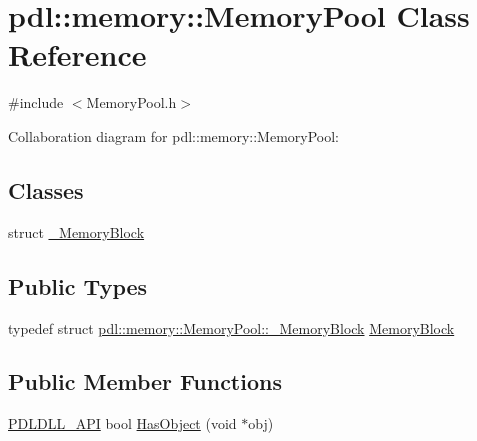 \hypertarget{classpdl_1_1memory_1_1_memory_pool}{}\section{pdl\+::memory\+::Memory\+Pool Class Reference}
\label{classpdl_1_1memory_1_1_memory_pool}


{\ttfamily \#include $<$Memory\+Pool.\+h$>$}



Collaboration diagram for pdl\+::memory\+::Memory\+Pool\+:
\subsection*{Classes}
\begin{DoxyCompactItemize}
\item 
struct \mbox{\hyperlink{structpdl_1_1memory_1_1_memory_pool_1_1___memory_block}{\+\_\+\+Memory\+Block}}
\end{DoxyCompactItemize}
\subsection*{Public Types}
\begin{DoxyCompactItemize}
\item 
typedef struct \mbox{\hyperlink{structpdl_1_1memory_1_1_memory_pool_1_1___memory_block}{pdl\+::memory\+::\+Memory\+Pool\+::\+\_\+\+Memory\+Block}} \mbox{\hyperlink{classpdl_1_1memory_1_1_memory_pool_ae6b2ec19cb71cae4fa60b7d342a1743b}{Memory\+Block}}
\end{DoxyCompactItemize}
\subsection*{Public Member Functions}
\begin{DoxyCompactItemize}
\item 
\mbox{\hyperlink{_p_d_core_8h_ae8c5186e53170509c65eaabab6c2c705}{P\+D\+L\+D\+L\+L\+\_\+\+A\+PI}} bool \mbox{\hyperlink{classpdl_1_1memory_1_1_memory_pool_a891cf16919c413a0acf7d4b39022892b}{Has\+Object}} (void $\ast$obj)
\end{DoxyCompactItemize}
